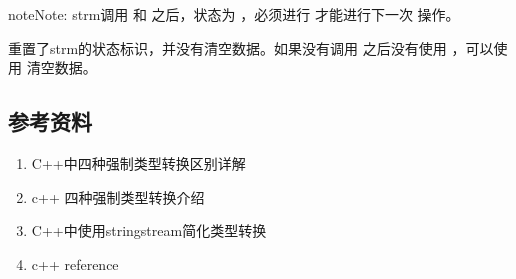 \documentclass[letterpaper,10pt,english]{sphinxmanual}
\begin{document}
\begin{sphinxadmonition}{note}{Note:}
strm调用  \sphinxcode{\sphinxupquote{\textless{}\textless{}}} 和 \sphinxcode{\sphinxupquote{\textgreater{}\textgreater{}}} 之后，状态为  ，必须进行  才能进行下一次 \sphinxcode{\sphinxupquote{\textless{}\textless{}}} 操作。

 重置了strm的状态标识，并没有清空数据。如果没有调用 \sphinxcode{\sphinxupquote{\textless{}\textless{}}} 之后没有使用 \sphinxcode{\sphinxupquote{\textgreater{}\textgreater{}}} ，可以使用   清空数据。
\end{sphinxadmonition}


\subsection{参考资料}
\label{\detokenize{cpp/10_cast:id3}}\begin{enumerate}
\item {} 
C++中四种强制类型转换区别详解

\end{enumerate}
\begin{quote}

\end{quote}
\begin{enumerate}
\setcounter{enumi}{1}
\item {} 
c++ 四种强制类型转换介绍

\end{enumerate}
\begin{quote}

\end{quote}
\begin{enumerate}
\setcounter{enumi}{2}
\item {} 
C++中使用stringstream简化类型转换

\end{enumerate}
\begin{quote}

\end{quote}
\begin{enumerate}
\setcounter{enumi}{3}
\item {} 
c++ reference

\end{enumerate}
\end{document}
